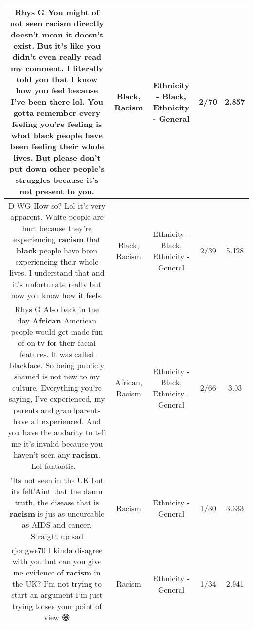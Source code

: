 \documentclass[11pt]{article}
\newlength\mylength
\begin{document}
\begin{center}
\begin{longtable}{|C{.65\mylength}|C{.30\mylength}|C{.12\mylength}|C{.12\mylength}|C{.12\mylength}|}
  \small Rhys G You might of not seen \textbf{racism} directly doesn't mean it doesn't exist. But it's like you didn't even really read my comment. I literally told you that I know how you feel because I've been there lol. You gotta remember every feeling you're feeling is what \textbf{black} people have been feeling their whole lives. But please don't put down other people's struggles because it's not present to you.\normalsize   & Black, Racism & Ethnicity - Black, Ethnicity - General & 2/70 & 2.857 \\  \hline
  \small D WG How so? Lol it's very apparent. White people are hurt because they're experiencing \textbf{racism} that \textbf{black} people have been experiencing their whole lives. I understand that and it's unfortunate really but now you know how it feels.\normalsize   & Black, Racism & Ethnicity - Black, Ethnicity - General & 2/39 & 5.128 \\  \hline
  \small Rhys G Also back in the day \textbf{African} American people would get made fun of on tv for their facial features. It was called blackface. So being publicly shamed is not new to my culture. Everything you're saying, I've experienced, my parents and grandparents have all experienced. And you have the audacity to tell me it's invalid because you haven't seen any \textbf{racism}. Lol fantastic. 👍🏿\normalsize   & African, Racism & Ethnicity - Black, Ethnicity - General & 2/66 & 3.03 \\  \hline
  \small 'Its not seen in the UK but its felt'Aint that the damn truth, the disease that is \textbf{racism} is jus as uncureable as AIDS and cancer. Straight up sad\normalsize   & Racism & Ethnicity - General & 1/30 & 3.333 \\  \hline
  \small rjongwe70 I kinda disagree with you but can you give me evidence of \textbf{racism} in the UK? I'm not trying to start an argument I'm just trying to see your point of view 😁\normalsize   & Racism & Ethnicity - General & 1/34 & 2.941 \\  \hline

\end{longtable}
\end{center}
\end{document}
